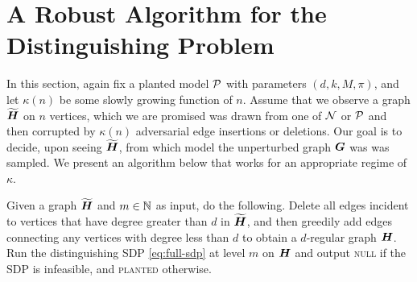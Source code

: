 \section{A Robust Algorithm for the Distinguishing Problem} \label{sec:robust}

In this section, again fix a planted model $\mathcal{P}$ with parameters $(d,k,M,\pi)$, and let $\kappa(n)$ be some slowly growing function of $n$. Assume that we observe a graph $\widetilde{\boldsymbol{H}}$ on $n$ vertices, which we are promised was drawn from one of $\mathcal{N}$ or $\mathcal{P}$ and then corrupted by $\kappa(n)$ adversarial edge insertions or deletions. Our goal is to decide, upon seeing $\widetilde{\boldsymbol{H}}$, from which model the unperturbed graph $\boldsymbol{G}$ was was sampled. We present an algorithm below that works for an appropriate regime of $\kappa$. 

\begin{algorithm}	\label{alg:robust}
	Given a graph $\widetilde{\boldsymbol{H}}$ and $m \in \mathbb{N}$ as input, do the following.  Delete all edges incident to vertices that have degree greater than $d$ in $\widetilde{\boldsymbol{H}}$, and then greedily add edges connecting any vertices with degree less than $d$ to obtain a $d$-regular graph $\boldsymbol{H}$. Run the distinguishing SDP \eqref{eq:full-sdp} at level $m$ on $\boldsymbol{H}$ and output \textsc{null} if the SDP is infeasible, and \textsc{planted} otherwise.
\end{algorithm}

